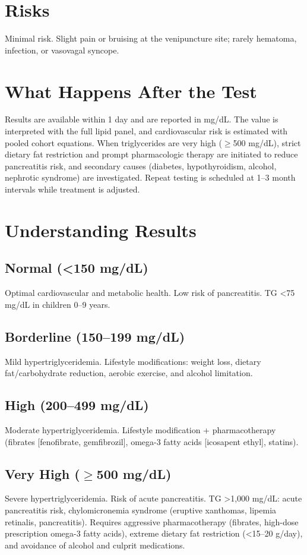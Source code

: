 \section*{Risks}
Minimal risk. Slight pain or bruising at the venipuncture site; rarely hematoma, infection, or vasovagal syncope.
\section*{What Happens After the Test}
Results are available within 1 day and are reported in mg/dL. The value is interpreted with the full lipid panel, and cardiovascular risk is estimated with pooled cohort equations. When triglycerides are very high ($\geq$500 mg/dL), strict dietary fat restriction and prompt pharmacologic therapy are initiated to reduce pancreatitis risk, and secondary causes (diabetes, hypothyroidism, alcohol, nephrotic syndrome) are investigated. Repeat testing is scheduled at 1--3 month intervals while treatment is adjusted.
\section*{Understanding Results}
\subsection*{Normal (<150 mg/dL)}
Optimal cardiovascular and metabolic health. Low risk of pancreatitis. TG <75 mg/dL in children 0--9 years.
\subsection*{Borderline (150--199 mg/dL)}
Mild hypertriglyceridemia. Lifestyle modifications: weight loss, dietary fat/carbohydrate reduction, aerobic exercise, and alcohol limitation.
\subsection*{High (200--499 mg/dL)}
Moderate hypertriglyceridemia. Lifestyle modification + pharmacotherapy (fibrates [fenofibrate, gemfibrozil], omega-3 fatty acids [icosapent ethyl], statins).
\subsection*{Very High ($\geq$500 mg/dL)}
Severe hypertriglyceridemia. Risk of acute pancreatitis. TG >1,000 mg/dL: acute pancreatitis risk, chylomicronemia syndrome (eruptive xanthomas, lipemia retinalis, pancreatitis). Requires aggressive pharmacotherapy (fibrates, high-dose prescription omega-3 fatty acids), extreme dietary fat restriction (<15--20 g/day), and avoidance of alcohol and culprit medications.
